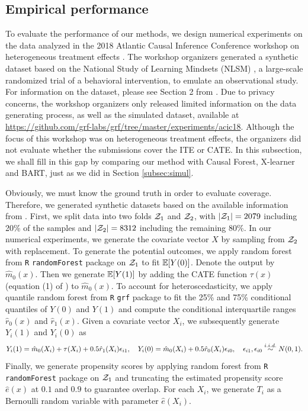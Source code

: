 \subsection{Empirical performance}

To evaluate the performance of our methods, we design numerical
experiments on the data analyzed in the 2018 Atlantic Causal Inference
Conference workshop on heterogeneous treatment effects
\citep{carvalho2019assessing}. The workshop organizers generated a
synthetic dataset based on the National Study of Learning Mindsets
(NLSM) \citep{yeager2019national}, a large-scale randomized trial of a
behavioral intervention, to emulate an observational study.  For
information on the dataset, please see Section 2 from
\cite{carvalho2019assessing}. Due to privacy concerns, the workshop
organizers only released limited information on the data generating
process, as well as the simulated dataset, available at
\url{https://github.com/grf-labs/grf/tree/master/experiments/acic18}.
Although the focus of this workshop was
on heterogeneous treatment effects, the organizers did not evaluate
whether the submissions cover the ITE or CATE. In this subsection, we
shall fill in this gap by comparing our method with Causal Forest,
X-learner and BART, just as we did in Section \ref{subsec:simul}.

Obviously, we must know the ground truth in order to evaluate
coverage. Therefore, we generated synthetic datasets based on the
available information from \cite{carvalho2019assessing}. First, we
split data into two folds $\mathcal{Z}_{1}$ and $\mathcal{Z}_{2}$, with
$|\mathcal{Z}_{1}| = 2079$ including 20\% of the samples and $|\mathcal{Z}_{2}| = 8312$
including the remaining 80\%. In our numerical experiments, we
generate the covariate vector $X$ by sampling from $\mathcal{Z}_{2}$ with
replacement. To generate the potential outcomes, we apply random
forest from \texttt{R} \texttt{randomForest} package on $\mathcal{Z}_{1}$ to
fit $\mathbb{E} [Y(0)]$. Denote the output by $\hat{m}_{0}(x)$. Then we
generate $\mathbb{E} [Y(1)]$ by adding the CATE function $\tau(x)$ (equation
(1) of \cite{carvalho2019assessing}) to $\hat{m}_{0}(x)$. To account
for heteroscedasticity, we apply quantile random forest from
\texttt{R} \texttt{grf} package to fit the 25\% and 75\% conditional
quantiles of $Y(0)$ and $Y(1)$ and compute the conditional
interquartile ranges $\hat{r}_{0}(x)$ and $\hat{r}_{1}(x)$. Given a
covariate vector $X_{i}$, we subsequently generate $Y_{i}(1)$ and
$Y_{i}(0)$ as
\[
Y_{i}(1) = \hat{m}_{0}(X_{i}) + \tau(X_{i}) +
0.5\hat{r}_{1}(X_{i})\epsilon_{i1}, \quad Y_{i}(0) = \hat{m}_{0}(X_{i}) +
0.5\hat{r}_{0}(X_{i})\epsilon_{i0},\quad \epsilon_{i1},
\epsilon_{i0}\stackrel{i.i.d.}{\sim} N(0, 1).
\]
Finally, we generate propensity scores by applying random forest from
\texttt{R} \texttt{randomForest} package on $\mathcal{Z}_{1}$ and truncating
the estimated propensity score $\hat{e}(x)$ at $0.1$ and $0.9$ to
guarantee overlap. For each $X_{i}$, we generate $T_{i}$ as a
Bernoulli random variable with parameter $\hat{e}(X_{i})$.

